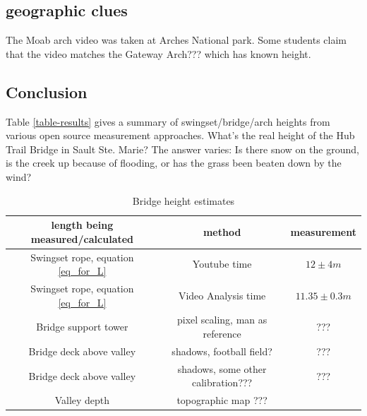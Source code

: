 \documentclass[12pt]{iopart}
\begin{document}


\subsection{geographic clues}
The Moab arch video was taken at Arches National park.  
Some students claim that the video matches the Gateway Arch??? which has known height.


\clearpage
\subsection{Conclusion}

Table \ref{table-results} gives a summary of swingset/bridge/arch heights from various open source measurement approaches.  What's the real height of the Hub Trail Bridge in Sault Ste. Marie? The answer varies: Is there snow on the ground, is the creek up because of flooding, or has the grass been beaten down by the wind?  

\begin{table}[h!]
    \centering
    \begin{tabular}{|c|c|c|}
        \hline
        \textbf{length being measured/calculated} & \textbf{method} & \textbf{measurement }\\
	\hline
	Swingset rope, equation \ref{eq_for_L} & Youtube time & $12\pm4 m$ \\ 
        \hline
        Swingset rope, equation \ref{eq_for_L} & Video Analysis time & $11.35\pm0.3 m$\\ 
        \hline
        Bridge support tower & pixel scaling, man as reference & ???\\ 
        \hline
        Bridge deck above valley & shadows, football field? & ???\\ 
	\hline
        Bridge deck above valley & shadows, some other calibration??? & ???\\ 
\hline
	Valley depth & topographic map ??? & \\
\hline    
\end{tabular}
    \caption{Bridge height estimates}
    \label{table:-results}
\end{table}
\end{document}
